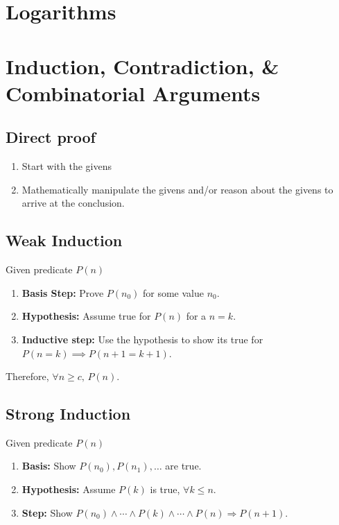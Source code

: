 \documentclass{article}
\begin{document}
\newpage

\section{Logarithms}
\newpage

\section{Induction, Contradiction, \& Combinatorial Arguments}
\subsection{Direct proof}
\begin{process}
    \begin{enumerate}
        \item Start with the givens
        \item Mathematically manipulate the givens and/or reason about the givens to arrive at the conclusion.
    \end{enumerate}
\end{process}

\subsection{Weak Induction}
\begin{process}
    Given predicate $P(n)$
    \begin{enumerate}
        \item \textbf{Basis Step:} Prove $P(n_0)$ for some value $n_0$. 
        \item \textbf{Hypothesis:} Assume true for $P(n)$ for a $n=k$.
        \item \textbf{Inductive step:} Use the hypothesis to show its true for $P(n=k) \implies P(n+1=k+1)$.
    \end{enumerate}
    Therefore, $\forall n \geq c \text{, } P(n)$.
\end{process}

\subsection{Strong Induction}
\begin{process} 
    Given predicate $P(n)$
    \begin{enumerate}
        \item \textbf{Basis:} Show \( P(n_0), P(n_1), \ldots \) are true.
        \item \textbf{Hypothesis:} Assume \( P(k) \) is true, \( \forall k \leq n \).
        \item \textbf{Step:} Show \( P(n_0) \land \cdots \land P(k) \land \cdots \land P(n) \Rightarrow P(n+1) \).
    \end{enumerate}    
\end{process}
\end{document}
